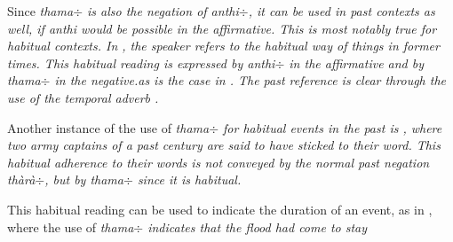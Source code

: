 Since \em thama$\div$ \em is also the negation of \em anthi$\div$\em, it can be used in past contexts as well, if \em anthi \em would be possible in the affirmative. This is most notably true for habitual contexts. In , the speaker refers to the habitual way of things in former times. This habitual reading is expressed by \em anthi$\div$ \em in the affirmative and by \em thama$\div$ \em in the negative.as is the case in  . The past reference is clear through the use of the temporal adverb .


Another instance of the use of \em thama$\div$ \em for habitual events in the past is , where two army captains of a past century are said to have sticked to their word. This habitual adherence to their words is not conveyed by the normal past negation \em thàrà$\div$\em, but by \em thama$\div$ \em since it is habitual.



This habitual reading can be used to indicate the duration of an event, as in , where the use of \em thama$\div$ \em indicates that the flood had come to stay


